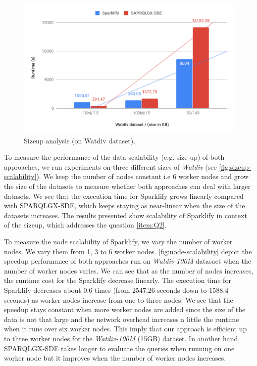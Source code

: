 \begin{figure}
 \includegraphics[width=1.0\columnwidth]{images/sizeup-scalability.pdf}
    \caption{Sizeup analysis (on Watdiv dataset).}
    \label{fig:sizeup-scalability}
\end{figure}

To measure the performance of the data scalability (e.g. size-up) of both approaches, we run experiments on three different sizes of \textit{Watdiv} (see \autoref{fig:sizeup-scalability}).
We keep the number of nodes constant i.e 6 worker nodes and grow the size of the datasets to measure whether both approaches can deal with larger datasets.
We see that the execution time for Sparklify grows linearly compared with SPARQLGX-SDE, which keeps staying as near-linear when the size of the datasets increases. 
The results presented show scalability of Sparklify in context of the sizeup, which addresses the question \ref{item:Q2}.

To measure the node scalability of Sparklify, we vary the number of worker nodes.
We vary them from 1, 3 to 6 worker nodes.
\autoref{fig:node-scalability} depict the speedup performance of both approaches run on \textit{Watdiv-100M} datasaet when the number of worker nodes varies.
We can see that as the number of nodes increases, the runtime cost for the Sparklify decrease linearly.
The execution time for Sparklify decreases about 0.6 times (from 2547.26 seconds down to 1588.4 seconds) as worker nodes increase from one to three nodes.
We see that the speedup stays constant when more worker nodes are added since the size of the data is not that large and the network overhead increases a little the runtime when it runs over six worker nodes.
This imply that our approach is efficient up to three worker nodes for the \textit{Watdiv-100M} (15GB) dataset.
In another hand, SPARQLGX-SDE takes longer to evaluate the queries when running on one worker node but it improves when the number of worker nodes increases.

